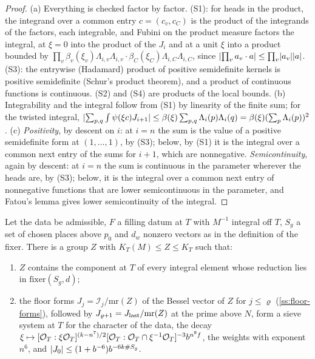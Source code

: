 \begin{proof}
(a) Everything is checked factor by factor. (S1): for heads in the product, the integrand over a common entry $c=(c_v,c_C)$ is the product of the integrands of the factors, each integrable, and Fubini on the product measure
factors the integral, at $\xi=0$ into the product of the $J_i$ and at a unit $\xi$ into a product bounded by $\prod_v\beta_v(\xi_v)\Lambda_{i,v}\Lambda_{i,v}\cdot\beta_C(\xi_C)\Lambda_{i,C}\Lambda_{i,C}$, since $\lvert \prod_va_v\cdot a\rvert\le\prod_v\lvert a_v\rvert\lvert a\rvert$. (S3): the
entrywise (Hadamard) product of positive semidefinite kernels is positive semidefinite (Schur's product theorem), and a product of continuous functions is continuous. (S2) and (S4) are products of the local bounds.
(b) Integrability and the integral follow from (S1) by linearity of the finite sum; for the twisted integral, $\lvert \sum_{p,q}\int\psi(\xi c)J_{i+1}\rvert\le\beta(\xi)\sum_{p,q}\Lambda_i(p)\Lambda_i(q)=\beta(\xi)(\sum_p\Lambda_i(p))^2$.
(c) \emph{Positivity}, by descent on $i$: at $i=n$ the sum is the value of a positive semidefinite form at $(1,\dots,1)$, by (S3); below, by (S1) it is the integral over a common next entry of the sums for $i+1$, which are
nonnegative. \emph{Semicontinuity}, again by descent: at $i=n$ the sum is continuous in the parameter wherever the heads are, by (S3); below, it is the integral over a common next entry of nonnegative functions that are
lower semicontinuous in the parameter, and Fatou's lemma gives lower semicontinuity of the integral.
\end{proof}

\begin{proposition}\label{prop:finite-sieve}
Let the data be admissible, $F$ a filling datum at $T$ with $M^{-1}$ integral off $T$, $S_g$ a set of chosen places above $p_0$ and $d_w$ nonzero vectors as in the definition of the fixer. There is a
group $Z$ with $K_T(M)\le Z\le K_T$ such that:
\begin{enumerate}[label=\textup{(\alph*)}]
\item $Z$ contains the component at $T$ of every integral element whose reduction lies in $\mathrm{fixer}(S_g,d)$;
\item the floor forms $J_j=\mathcal I_j/\mathrm{mr}(Z)$ of the Bessel vector of $Z$ for $j\le\varrho$ (\cref{ss:floor-forms}), followed by $J_{\varrho+1}=J_{\rm last}/\mathrm{mr}(Z)$ at the prime above $N$,
form a sieve system at $T$ for the character of the data, the decay $\xi\mapsto[\mathcal{O}_T:\xi\mathcal{O}_T]^{(k-n^7)/2}[\mathcal{O}_T:\mathcal{O}_T\cap\xi^{-1}\mathcal{O}_T]^{-3}b^{n^9f}$, the weights with exponent $n^6$, and
$\lvert J_0\rvert\le(1+b^{-6})b^{-6k\#S_g}$.
\end{enumerate}
\end{proposition}

